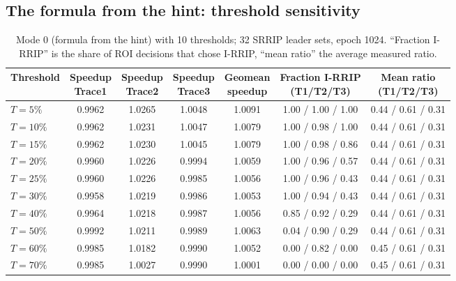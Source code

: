 \subsection{The formula from the hint: threshold sensitivity}
\begin{table}[H]\centering\small
\begin{tabular}{@{}lcccccc@{}}
\toprule
Threshold & \makecell{Speedup\\Trace1} & \makecell{Speedup\\Trace2} & \makecell{Speedup\\Trace3} & \makecell{Geomean\\speedup}
          & \makecell{Fraction I-RRIP\\(T1/T2/T3)} & \makecell{Mean ratio\\(T1/T2/T3)} \\
\midrule
$T = 5\%$  & 0.9962 & 1.0265 & 1.0048 & 1.0091 & 1.00 / 1.00 / 1.00 & 0.44 / 0.61 / 0.31 \\
$T = 10\%$ & 0.9962 & 1.0231 & 1.0047 & 1.0079 & 1.00 / 0.98 / 1.00 & 0.44 / 0.61 / 0.31 \\
$T = 15\%$ & 0.9962 & 1.0230 & 1.0045 & 1.0079 & 1.00 / 0.98 / 0.86 & 0.44 / 0.61 / 0.31 \\
$T = 20\%$ & 0.9960 & 1.0226 & 0.9994 & 1.0059 & 1.00 / 0.96 / 0.57 & 0.44 / 0.61 / 0.31 \\
$T = 25\%$ & 0.9960 & 1.0226 & 0.9985 & 1.0056 & 1.00 / 0.96 / 0.43 & 0.44 / 0.61 / 0.31 \\
$T = 30\%$ & 0.9958 & 1.0219 & 0.9986 & 1.0053 & 1.00 / 0.94 / 0.43 & 0.44 / 0.61 / 0.31 \\
$T = 40\%$ & 0.9964 & 1.0218 & 0.9987 & 1.0056 & 0.85 / 0.92 / 0.29 & 0.44 / 0.61 / 0.31 \\
$T = 50\%$ & 0.9992 & 1.0211 & 0.9989 & 1.0063 & 0.04 / 0.90 / 0.29 & 0.44 / 0.61 / 0.31 \\
$T = 60\%$ & 0.9985 & 1.0182 & 0.9990 & 1.0052 & 0.00 / 0.82 / 0.00 & 0.45 / 0.61 / 0.31 \\
$T = 70\%$ & 0.9985 & 1.0027 & 0.9990 & 1.0001 & 0.00 / 0.00 / 0.00 & 0.45 / 0.61 / 0.31 \\
\bottomrule
\end{tabular}
\caption{Mode 0 (formula from the hint) with 10 thresholds; 32 SRRIP leader sets, epoch 1024. ``Fraction I-RRIP'' is
the share of ROI decisions that chose I-RRIP, ``mean ratio'' the average measured ratio.}
\label{tab:t2b-thr}
\end{table}

